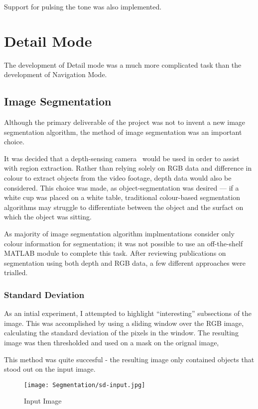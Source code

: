 Support for pulsing the tone was also implemented. 

\section{Detail Mode}
The development of Detail mode was a much more complicated task than the development of Navigation Mode.

\subsection{Image Segmentation}
Although the primary deliverable of the project was not to invent a new image segmentation algorithm, the method of image segmentation was an important choice.

It was decided that a depth-sensing camera~\cite{xtion} would be used in order to assist with region extraction. Rather than relying solely on RGB data and difference in colour to extract objects from the video footage, depth data would also be considered. This choice was made, as object-segmentation was desired --- if a white cup was placed on a white table, traditional colour-based segmentation algorithms may struggle to differentiate between the object and the surfact on which the object was sitting.

As majority of image segmentation algorithm implmentations consider only colour information for segmentation; it was not possible to use an off-the-shelf MATLAB module to complete this task. After reviewing publications on segmentation using both depth and RGB data, a few different approaches were trialled.

\subsubsection{Standard Deviation}
As an intial experiment, I attempted to highlight ``interesting'' subsections of the image. This was accomplished by using a sliding window over the RGB image, calculating the standard deviation of the pixels in the window. The resulting image was then thresholded and used on a mask on the orignal image,

This method was quite succesful - the resulting image only contained objects that stood out on the input image.

\begin{figure}[H]
    \centering
    \texttt{[image: Segmentation/sd-input.jpg]}
    \caption{Input Image}
\end{figure}

